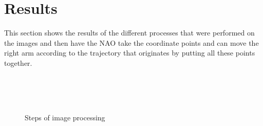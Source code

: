\documentclass[conference]{IEEEtran}
\begin{document}
\section{Results}

This section shows the results of the different processes that were performed on the images and then have the NAO take the coordinate points and can move the right arm according to the trajectory that originates by putting all these points together.

\begin{figure}[htb]
\centering
~
~\\
~
~\\
~
\caption{Steps of image processing} \label{f:triangle}
\end{figure}
\end{document}
